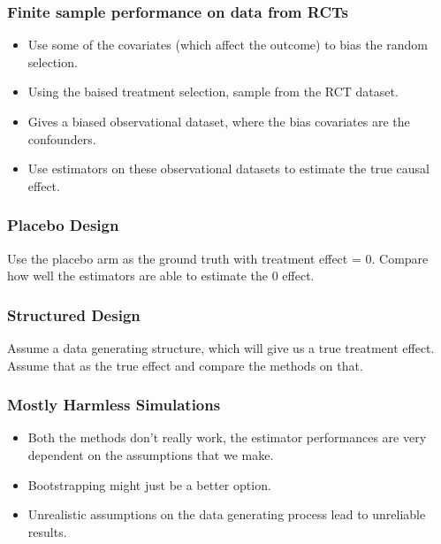 \documentclass{beamer}
\begin{document}
\begin{frame}
	\frametitle{Finite sample performance on data from RCTs}
	\begin{itemize}
		\item Use some of the covariates (which affect the outcome) to bias the random
			selection.
		\item Using the baised treatment selection, sample from the RCT dataset.
		\item Gives a biased observational dataset, where the bias covariates are the 
			confounders.
		\item Use estimators on these observational datasets to estimate the true 
			causal effect.
	\end{itemize}
\end{frame}

\begin{frame}
	\frametitle{Placebo Design}
	Use the placebo arm as the ground truth with treatment effect = $ 0 $. Compare how well
	the estimators are able to estimate the $ 0 $ effect.
\end{frame}

\begin{frame}
	\frametitle{Structured Design}
	Assume a data generating structure, which will give us a true treatment effect. Assume
	that as the true effect and compare the methods on that.
\end{frame}

\begin{frame}
	\frametitle{Mostly Harmless Simulations}
	\begin{itemize}
		\item Both the methods don't really work, the estimator performances are very
			dependent on the assumptions that we make.
		\item Bootstrapping might just be a better option.
		\item Unrealistic assumptions on the data generating process lead to unreliable results.
	\end{itemize}
\end{frame}
\end{document}
